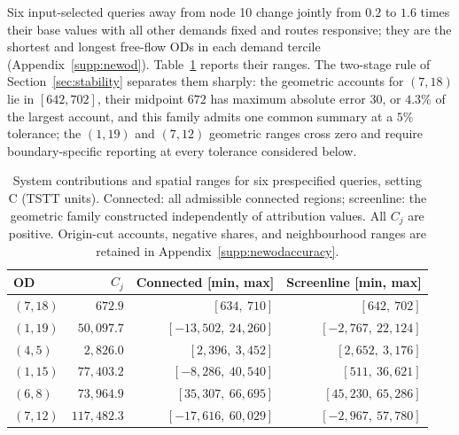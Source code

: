 Six input-selected queries away from node 10 change jointly from $0.2$ to $1.6$ times their base values with all other demands fixed and routes responsive; they are the shortest and longest free-flow ODs in each demand tercile (Appendix~\ref{supp:newod}). Table~\ref{tab:newod} reports their ranges. The two-stage rule of Section~\ref{sec:stability} separates them sharply: the geometric accounts for $(7,18)$ lie in $[642,702]$, their midpoint $672$ has maximum absolute error $30$, or $4.3\%$ of the largest account, and this family admits one common summary at a $5\%$ tolerance; the $(1,19)$ and $(7,12)$ geometric ranges cross zero and require boundary-specific reporting at every tolerance considered below.
\begin{table}[pos=htbp]
\caption{System contributions and spatial ranges for six prespecified queries,
setting C (TSTT units). Connected: all admissible connected regions;
screenline: the geometric family constructed independently of attribution
values. All $C_j$ are positive. Origin-cut accounts, negative shares, and
neighbourhood ranges are retained in Appendix~\ref{supp:newodaccuracy}.}
\label{tab:newod}
\small
\begin{tabular*}{\tblwidth}{@{\extracolsep{\fill}}lrrr}
\toprule
OD & $C_j$ & Connected [min, max] & Screenline [min, max]\\
\midrule
$(7,18)$ & $672.9$ & $[634{,}\ 710]$ & $[642{,}\ 702]$ \\
$(1,19)$ & $50{,}097.7$ & $[-13{,}502{,}\ 24{,}260]$ & $[-2{,}767{,}\ 22{,}124]$ \\
$(4,5)$ & $2{,}826.0$ & $[2{,}396{,}\ 3{,}452]$ & $[2{,}652{,}\ 3{,}176]$ \\
$(1,15)$ & $77{,}403.2$ & $[-8{,}286{,}\ 40{,}540]$ & $[511{,}\ 36{,}621]$ \\
$(6,8)$ & $73{,}964.9$ & $[35{,}307{,}\ 66{,}695]$ & $[45{,}230{,}\ 65{,}286]$ \\
$(7,12)$ & $117{,}482.3$ & $[-17{,}616{,}\ 60{,}029]$ & $[-2{,}967{,}\ 57{,}780]$ \\
\bottomrule
\end{tabular*}
\end{table}

